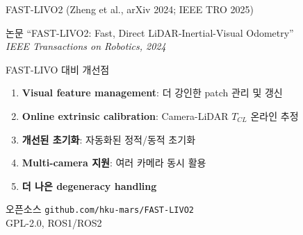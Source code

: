 \begin{frame}{FAST-LIVO2 (Zheng et al., arXiv 2024; IEEE TRO 2025)}
  \begin{block}{논문}
    ``FAST-LIVO2: Fast, Direct LiDAR-Inertial-Visual Odometry''\\
    \textit{IEEE Transactions on Robotics, 2024}
  \end{block}
  \pause
  \begin{block}{FAST-LIVO 대비 개선점}
    \begin{enumerate}
      \item \textbf{Visual feature management}: 더 강인한 patch 관리 및 갱신
      \item \textbf{Online extrinsic calibration}: Camera-LiDAR $T_{CL}$ 온라인 추정
      \item \textbf{개선된 초기화}: 자동화된 정적/동적 초기화
      \item \textbf{Multi-camera 지원}: 여러 카메라 동시 활용
      \item \textbf{더 나은 degeneracy handling}
    \end{enumerate}
  \end{block}
  \pause
  \begin{exampleblock}{오픈소스}
    \texttt{github.com/hku-mars/FAST-LIVO2}\\
    GPL-2.0, ROS1/ROS2
  \end{exampleblock}
\end{frame}


